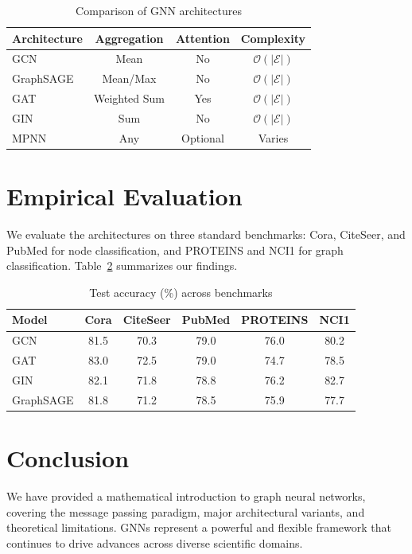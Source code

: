 \documentclass[11pt,a4paper]{article}
\begin{document}
\begin{table}[htbp]
    \centering
    \caption{Comparison of GNN architectures}
    \label{tab:gnn_comparison}
    \begin{tabular}{@{}lccc@{}}
        \toprule
        Architecture & Aggregation & Attention & Complexity \\
        \midrule
        GCN          & Mean        & No        & $\mathcal{O}(|\mathcal{E}|)$ \\
        GraphSAGE    & Mean/Max    & No        & $\mathcal{O}(|\mathcal{E}|)$ \\
        GAT          & Weighted Sum& Yes       & $\mathcal{O}(|\mathcal{E}|)$ \\
        GIN          & Sum         & No        & $\mathcal{O}(|\mathcal{E}|)$ \\
        MPNN         & Any         & Optional  & Varies \\
        \bottomrule
    \end{tabular}
\end{table}

\section{Empirical Evaluation}
We evaluate the architectures on three standard benchmarks: Cora, CiteSeer, and PubMed for node
classification, and PROTEINS and NCI1 for graph classification. Table~\ref{tab:results} summarizes
our findings.

\begin{table}[htbp]
    \centering
    \caption{Test accuracy (\%) across benchmarks}
    \label{tab:results}
    \begin{tabular}{@{}lccccc@{}}
        \toprule
        Model    & Cora  & CiteSeer & PubMed & PROTEINS & NCI1 \\
        \midrule
        GCN      & 81.5  & 70.3     & 79.0   & 76.0     & 80.2 \\
        GAT      & 83.0  & 72.5     & 79.0   & 74.7     & 78.5 \\
        GIN      & 82.1  & 71.8     & 78.8   & 76.2     & 82.7 \\
        GraphSAGE& 81.8  & 71.2     & 78.5   & 75.9     & 77.7 \\
        \bottomrule
    \end{tabular}
\end{table}

\section{Conclusion}
We have provided a mathematical introduction to graph neural networks, covering the message passing
paradigm, major architectural variants, and theoretical limitations. GNNs represent a powerful and
flexible framework that continues to drive advances across diverse scientific domains.
\end{document}
